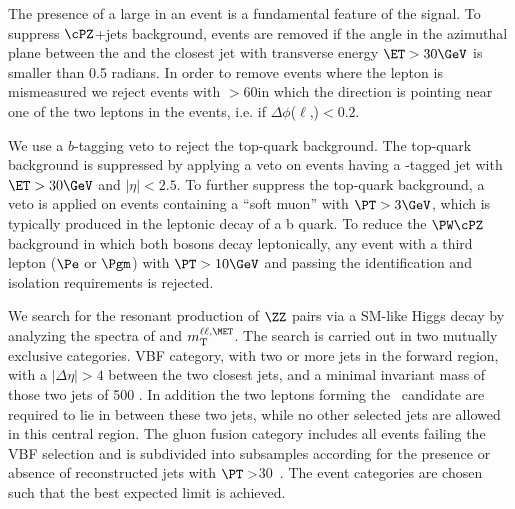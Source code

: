 The presence of a large \MET in an event
 is a fundamental feature of the signal.
To suppress $\cPZ$+jets 
background, events are removed if the angle in the azimuthal
plane between the \MET and the closest jet with transverse energy $\ET > 30\GeV$ is
smaller than 0.5 radians. 
In order to remove events where the lepton is mismeasured
we reject events with 
\MET$>$60\GeV in which the \MET direction is
pointing near one of the two leptons in the events, i.e. if $\Delta\phi$($\ell$,\MET)$<0.2$.

We use a $b$-tagging veto to reject the top-quark background.
The top-quark background is suppressed by applying a veto on 
events having a \cPqb-tagged jet with $\ET > 30\GeV$ and
$|\eta| < 2.5$.
To further suppress the top-quark background, a veto is applied on events containing a ``soft muon''
with $\PT > 3\GeV$, which is typically produced in the leptonic decay of a b quark.
To reduce the $\PW\cPZ$ background in which both bosons decay leptonically,
any event with a third lepton ($\Pe$ or $\Pgm$) with $\PT > 10\GeV$ and
passing the identification and isolation requirements is rejected.

We search for the resonant production of $\ZZ$ pairs via a SM-like Higgs decay
by analyzing the spectra of \MET and $m_\mathrm{T}^{\ell\ell,\MET}$.
The search is carried out in two mutually exclusive categories. 
VBF category, with two or more jets in the forward region,
with a $|\Delta\eta|>4$ between the two closest jets, and a minimal
invariant mass of those two jets of 500 \GeV. 
In addition the two leptons forming the \cPZ\ 
candidate are required to lie in between these two jets, while no other
selected jets are allowed in this central region. 
The gluon fusion category includes all events failing the VBF selection and is
subdivided into subsamples according for the presence or absence of reconstructed jets with $\PT>$30~\GeV. 
The event categories are chosen such that the best expected limit is
achieved.



